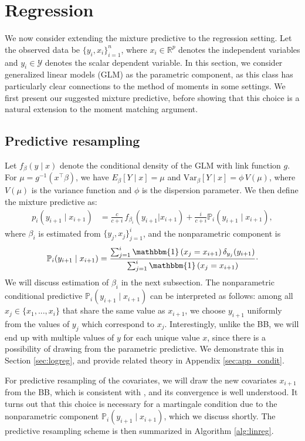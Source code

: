 \documentclass[11pt,a4paper]{article}
\theoremstyle{plain}
\theoremstyle{remark}
\theoremstyle{remark}
\begin{document}
\section{Regression}\label{sec:reg}
We now consider extending the mixture predictive to the regression setting. Let the observed data be $\{y_i, x_i\}_{i=1}^n$, where $x_i\in\mathbb{R}^p$ denotes the independent variables and $y_i \in \mathcal{Y}$ denotes the scalar dependent variable.  In this section, we consider generalized linear models (GLM) as the parametric component, as this class has particularly clear connections to the method of moments in some settings. We first present our suggested mixture predictive, before showing that this choice is a natural extension to the moment matching argument.

\subsection{Predictive resampling}
Let $f_{\beta}(y \mid x)$ denote the conditional density of the GLM with link function $g$. For $\mu  = g^{-1}(x^\top \beta)$, we have $E_{\beta}[Y\mid x]  = \mu$ and $\text{Var}_{\beta}\left[Y \mid x\right] = \phi \,V(\mu)$, where $V(\mu)$ is the variance function and $\phi$ is the dispersion parameter. We then define the mixture predictive as: 
\begin{align}\label{eq:linreg}
p_i(y_{i+1} \mid x_{i+1})&=\frac{c}{c+i}\, f_{\beta_i}(y_{i+1}|x_{i+1})
 + \frac{i}{c+i}\mathbb{P}_{i}(y_{i+1} \mid x_{i+1}),
\end{align}
where $\beta_i$ is estimated from $\{y_{j}, x_{j}\}_{j = 1}^i$, and the nonparametric component is
$$\mathbb{P}_i(y_{i+1} \mid x_{i+1}) = \frac{\sum_{j = 1}^i \mathbbm{1}\left(x_j = x_{i+1}\right) \delta_{y_j}(y_{i+1})}{\sum_{j = 1}^i \mathbbm{1}\left(x_j = x_{i+1}\right)}\cdot$$
We will discuss estimation of $\beta_i$ in the next subsection.
The nonparametric conditional predictive $\mathbb{P}_{i}(y_{i+1} \mid x_{i+1})$ can be interpreted as follows: among all $x_j \in \{x_1,...,x_i\}$ that share the same value as $x_{i+1}$, we choose $y_{i+1}$ uniformly from  the values of $y_j$ which correspond to $x_j$. Interestingly, unlike the BB, we will end up with multiple values of $y$ for each unique value $x$, since there is a possibility of drawing from the parametric predictive. We demonstrate this in Section \ref{sec:logreg}, and provide related theory in Appendix \ref{sec:app_condit}.


For predictive resampling of the covariates, we will draw the new covariates $x_{i+1}$ from the BB, which is consistent with \cite{holmes2023statistical}, and its convergence is well understood. 
It turns out that this choice is necessary for a martingale condition due to the nonparametric component $\mathbb{P}_i(y_{i+1} \mid x_{i+1})$, which we discuss shortly. The predictive resampling scheme is then summarized in Algorithm \ref{alg:linreg}.
\end{document}

